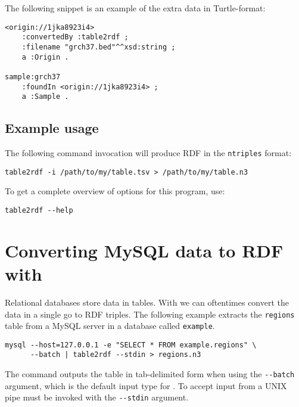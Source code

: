   The following snippet is an example of the extra data in Turtle-format:

\begin{siderules}
\begin{verbatim}
<origin://1jka8923i4>
    :convertedBy :table2rdf ;
    :filename "grch37.bed"^^xsd:string ;
    a :Origin .

sample:grch37
    :foundIn <origin://1jka8923i4> ;
    a :Sample .
\end{verbatim}
\end{siderules}

\subsection{Example usage}

The following command invocation will produce RDF in the \texttt{ntriples}
format:
\begin{siderules}
\begin{verbatim}
table2rdf -i /path/to/my/table.tsv > /path/to/my/table.n3
\end{verbatim}
\end{siderules}

To get a complete overview of options for this program, use:
\begin{siderules}
\begin{verbatim}
table2rdf --help
\end{verbatim}
\end{siderules}

\section{Converting MySQL data to RDF with }

  Relational databases store data in tables.  With  we
  can oftentimes convert the data in a single go to RDF triples.  The following
  example extracts the \texttt{regions} table from a MySQL server in a database
  called \texttt{example}.

\begin{siderules}
\begin{verbatim}
mysql --host=127.0.0.1 -e "SELECT * FROM example.regions" \
      --batch | table2rdf --stdin > regions.n3
\end{verbatim}
\end{siderules}

  The  command outputs the table in tab-delimited form when using
  the \texttt{-{}-batch} argument, which is the default input type for
  .  To accept input from a UNIX pipe \program{table2rdf} must
  be invoked with the \texttt{-{}-stdin} argument.

